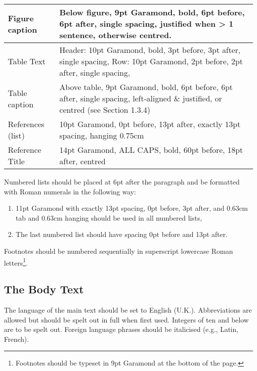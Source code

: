 \begin{table}[hbtp]
\begin{tabularx}{\textwidth}{|p{2.5cm}|L|}
    \hline
    Figure caption & Below figure, 9pt Garamond, bold, 6pt before, 6pt after, single spacing, justified when > 1 sentence, otherwise centred. \\
    \hline
    Table Text & Header: 10pt Garamond, bold, 3pt before, 3pt after, single spacing, Row: 10pt Garamond, 2pt before, 2pt after, single spacing, \\
    \hline
    Table caption & Above table, 9pt Garamond, bold, 6pt before, 6pt after, single spacing, left-aligned \& justified, or centred (see Section 1.3.4) \\
    \hline
    References (list) & 10pt Garamond, 0pt before, 13pt after, exactly 13pt spacing, hanging 0.75cm \\
    \hline
    Reference Title & 14pt Garamond, ALL CAPS, bold, 60pt before, 18pt after, centred \\
    \hline
    \end{tabularx}
    \label{tab:Styles}
    \raggedright\parnotes
\end{table}%

Numbered lists should be placed at 6pt after the paragraph and be formatted with Roman numerals in the following way:
\begin{enumerate}
    \item {}11pt Garamond with exactly 13pt spacing, 0pt before, 3pt after, and 0.63cm tab and 0.63cm hanging should be used in all numbered lists,
    \item The last numbered list should have spacing 0pt before and 13pt after.
\end{enumerate}

Footnotes should be numbered sequentially in superscript lowercase Roman letters\footnote{Footnotes should be typeset in 9pt Garamond at the bottom of the page.}.

\subsection{The Body Text}
The language of the main text should be set to English (U.K.). Abbreviations are allowed but should be spelt out in full when first used. Integers of ten and below are to be spelt out. Foreign language phrases should be italicised (e.g., Latin, French).

